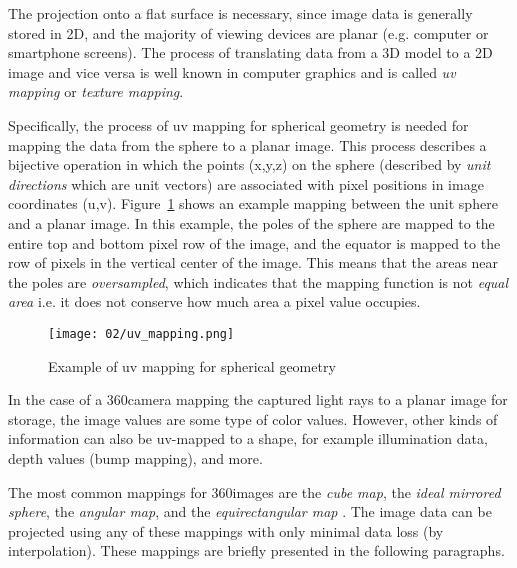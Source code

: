 The projection onto a flat surface is necessary, since image data is generally stored in 2D, and the majority of viewing devices are planar (e.g. computer or smartphone screens). The process of translating data from a 3D model to a 2D image and vice versa is well known in computer graphics and is called \emph{uv mapping} or \emph{texture mapping}.

Specifically, the process of uv mapping for spherical geometry is needed for mapping the data from the sphere to a planar image. This process describes a bijective operation in which the points (x,y,z) on the sphere (described by \emph{unit directions} which are unit vectors) are associated with pixel positions in image coordinates (u,v). Figure~\ref{fig:uv_mapping} shows an example mapping between the unit sphere and a planar image. In this example, the poles of the sphere are mapped to the entire top and bottom pixel row of the image, and the equator is mapped to the row of pixels in the vertical center of the image. This means that the areas near the poles are \emph{oversampled}, which indicates that the mapping function is not \emph{equal area} \cite[p.450]{hdrbook} i.e. it does not conserve how much area a pixel value occupies.

\begin{figure}
		\centering
		\texttt{[image: 02/uv\_mapping.png]}
		\caption[UV mapping example]{Example of uv mapping for spherical geometry}
		\label{fig:uv_mapping}
\end{figure}

In the case of a 360\degree camera mapping the captured light rays to a planar image for storage, the image values are some type of color values. However, other kinds of information can also be uv-mapped to a shape, for example illumination data, depth values (bump mapping), and more.

The most common mappings for 360\degree images are the \emph{cube map}, the \emph{ideal mirrored sphere}, the \emph{angular map},  and the \emph{equirectangular map} \cite[p. 535]{hdrbook}. The image data can be projected using any of these mappings with only minimal data loss (by interpolation). These mappings are briefly presented in the following paragraphs.

